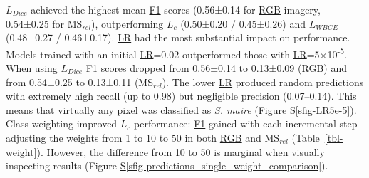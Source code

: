 \documentclass[
]{scrreprt}
\newcommand*\quartosfigref[1]{Figure \hyperref[#1]{S\ref{#1}}}
\begin{document}
\hyperref[acronyms_DICE]{\(L_{Dice}\)} achieved the highest mean
\hyperref[acronyms_F1]{F1} scores (0.56±0.14 for
\hyperref[acronyms_RGB]{RGB} imagery, 0.54±0.25 for MS\(_{rel}\)),
outperforming \hyperref[acronyms_WBCE_D]{\(L_{c}\)} (0.50±0.20 /
0.45±0.26) and \hyperref[acronyms_WBCE]{\(L_{WBCE}\)} (0.48±0.27 /
0.46±0.17). \hyperref[acronyms_LR]{LR} had the most substantial impact
on performance. Models trained with an initial
\hyperref[acronyms_LR]{LR}=0.02 outperformed those with
\hyperref[acronyms_LR]{LR}=5×10\textsuperscript{-5}. When using
\hyperref[acronyms_DICE]{\(L_{Dice}\)} \hyperref[acronyms_F1]{F1} scores
dropped from 0.56±0.14 to 0.13±0.09 (\hyperref[acronyms_RGB]{RGB}) and
from 0.54±0.25 to 0.13±0.11 (MS\(_{rel}\)). The lower
\hyperref[acronyms_LR]{LR} produced random predictions with extremely
high recall (up to 0.98) but negligible precision (0.07--0.14). This
means that virtually any pixel was classified as
\hyperref[acronyms_SM]{\emph{S. maire}} (\quartosfigref{sfig-LR5e-5}).
Class weighting improved \hyperref[acronyms_WBCE_D]{\(L_{c}\)}
performance: \hyperref[acronyms_F1]{F1} gained with each incremental
step adjusting the weights from 1 to 10 to 50 in both
\hyperref[acronyms_RGB]{RGB} and MS\(_{rel}\) (Table~\ref{tbl-weight}).
However, the difference from 10 to 50 is marginal when visually
inspecting results
(\quartosfigref{sfig-predictions_single_weight_comparison}).
\end{document}
